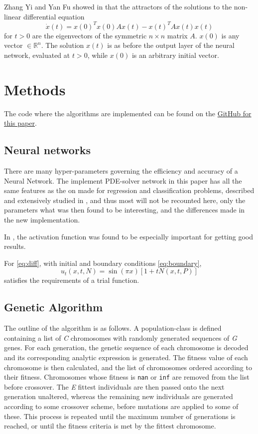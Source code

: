 \documentclass[multicolumn, 12pt]{extarticle}
\begin{document}
Zhang Yi and Yan Fu showed in \cite{symmetric} that the attractors of the solutions to the non-linear differential equation
\begin{equation*}
	\dot{x}(t) = x(0)^Tx(0)Ax(t)-x(t)^TAx(t)x(t)
\end{equation*}
for $t>0$ are the eigenvectors of the symmetric $n\times n$ matrix $A$. $x(0)$ is any vector $\in \mathbb{R}^n$. The solution $x(t)$ is as before the output layer of the neural network, evaluated at $t>0$, while $x(0)$ is an arbitrary initial vector.


\section{Methods}
The code where the algorithms are implemented can be found on the \href{https://github.com/SaraPJensen/FYS-STK/tree/main/Project3/code}{GitHub for this paper}.

\subsection{Neural networks}
There are many hyper-parameters governing the efficiency and accuracy of a Neural Network. The implement PDE-solver network in this paper has all the same features as the on made for regression and classification problems, described and extensively studied in \cite{p2HO}, and thus most will not be recounted here, only the parameters what was then found to be interesting, and the differences made in the new implementation.

In \cite{p2HO}, the activation function was found to be especially important for getting good results. 

For \eqref{eq:diff}, with initial and boundary conditions \eqref{eq:boundary},
\begin{equation}
	u_t(x, t, N) = \sin{(\pi x)}[1 + tN(x, t, P)]
\end{equation}
satisfies the requirements of a trial function.

\subsection{Genetic Algorithm}
The outline of the algorithm is as follows. A population-class is defined containing a list of \textit{C} chromosomes with randomly generated sequences of \textit{G} genes. For each generation, the genetic sequence of each chromosome is decoded and its corresponding analytic expression is generated. The fitness value of each chromosome is then calculated, and the list of chromosomes ordered according to their fitness. Chromosomes whose fitness is \texttt{nan} or \texttt{inf} are removed from the list before crossover. The \textit{E} fittest individuals are then passed onto the next generation unaltered, whereas the remaining new individuals are generated according to some crossover scheme, before mutations are applied to some of these.  This process is repeated until the maximum number of generations is reached, or until the fitness criteria is met by the fittest chromosome.
\end{document}
